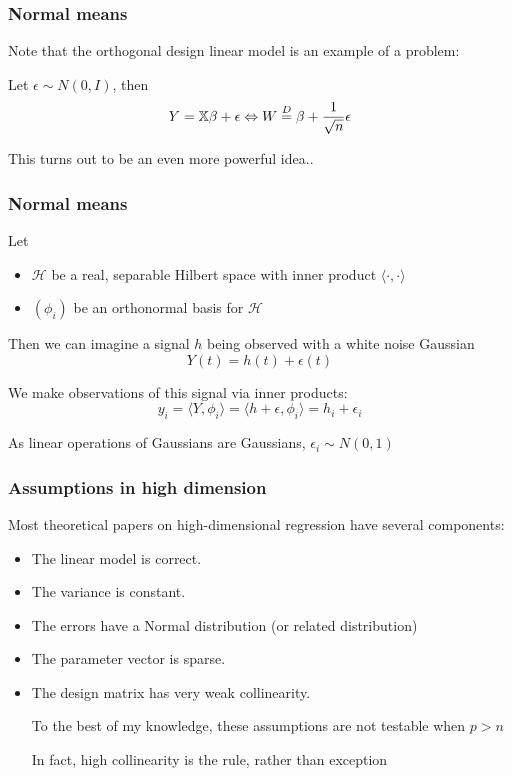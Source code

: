 \documentclass[12pt]{beamer}
\begin{document}
\begin{frame}
\frametitle{Normal means}
Note that the orthogonal design linear model is an example of a  problem:

\vsp
Let $\epsilon \sim N(0,I)$, then
\[
Y = \mathbb{X}\beta + \epsilon \Leftrightarrow W \stackrel{D}{=} \beta + \frac{1}{\sqrt{n}} \epsilon
\]

This turns out to be an even more powerful idea..
\end{frame}

\begin{frame}
\frametitle{Normal means}
Let
\begin{itemize}
\item $\mathcal{H}$ be a real, separable Hilbert space with inner product $\langle \cdot, \cdot \rangle$
\item $(\phi_i)$ be an orthonormal basis for $\mathcal{H}$
\end{itemize}
Then we can imagine a signal $h$ being observed with a white noise Gaussian  
\[
Y(t) = h(t) + \epsilon(t)
\]
\vsp

We make observations of this signal via inner products:
\[
y_i = \langle Y , \phi_i\rangle = \langle h + \epsilon , \phi_i\rangle = h_i+ \epsilon_i
\]

\vsp
As linear operations of Gaussians are Gaussians, $\epsilon_i \sim N(0,1)$ 
\end{frame}

\begin{frame}
\frametitle{Assumptions in high dimension}
Most theoretical
papers on high-dimensional regression have several components:
\begin{itemize}

\item The linear model is correct.
\item The variance is constant.
\item The errors have a Normal distribution (or related distribution)
\item The parameter vector is sparse.
\item The design matrix has very weak collinearity. 

\vsp

To the best of my knowledge, these assumptions are not testable when $p>n$

\vsp
In fact, high collinearity is the rule, rather than exception

\end{itemize}
\end{frame}
\end{document}
